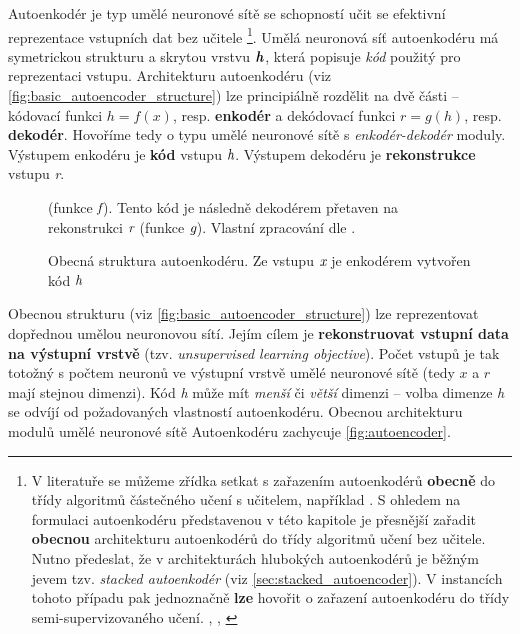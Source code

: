 Autoenkodér je typ umělé neuronové sítě se schopností učit se efektivní reprezentace vstupních dat bez učitele
\footnote{V literatuře se můžeme zřídka setkat s zařazením autoenkodérů \textbf{obecně} do třídy algoritmů částečného učení s učitelem, například \cite[str. 95]{Chollet2017}. S ohledem na formulaci autoenkodéru představenou v této kapitole je přesnější zařadit \textbf{obecnou} architekturu autoenkodérů do třídy algoritmů učení bez učitele. Nutno předeslat, že v architekturách hlubokých autoenkodérů je běžným jevem tzv. \emph{stacked autoenkodér} (viz \autoref{sec:stacked_autoencoder}). V instancích tohoto případu pak jednoznačně \textbf{lze} hovořit o zařazení autoenkodéru do třídy semi-supervizovaného učení. \cite{Bengio2006}, \cite{Ranzato2007}, \cite{Erhan2010}}.
Umělá neuronová síť autoenkodéru má symetrickou strukturu a skrytou vrstvu $\textbf{\emph{h}}$, která popisuje \emph{kód} použitý pro reprezentaci vstupu.
Architekturu autoenkodéru (viz \autoref{fig:basic_autoencoder_structure}) lze principiálně rozdělit na dvě části – kódovací funkci $h = f(x)$, resp. \textbf{enkodér}
a dekódovací funkci $r = g(h)$, resp. \textbf{dekodér}.
Hovoříme tedy o typu umělé neuronové sítě s \emph{enkodér-dekodér} moduly.
Výstupem enkodéru je \textbf{kód} vstupu $\emph{h}$. Výstupem dekodéru je \textbf{rekonstrukce} vstupu \emph{r}. \cite{Goodfellow2016}

\begin{figure}[h]
    \centering
    \caption{Obecná struktura autoenkodéru. Ze vstupu $\emph{x}$ je enkodérem vytvořen kód $\emph{h}$} (funkce $\emph{f}$). Tento kód je následně dekodérem přetaven na rekonstrukci $\emph{r}$ (funkce $\emph{g}$). Vlastní zpracování dle \textcite{Goodfellow2016}.
    \label{fig:basic_autoencoder_structure}
\end{figure}

Obecnou strukturu (viz \autoref{fig:basic_autoencoder_structure}) lze reprezentovat dopřednou umělou neuronovou sítí.
Jejím cílem je \textbf{rekonstruovat vstupní data na výstupní vrstvě} (tzv. \emph{unsupervised learning objective}). Počet vstupů je tak totožný s počtem neuronů ve výstupní vrstvě umělé neuronové sítě (tedy $x$ a $r$ mají stejnou dimenzi).
Kód \emph{h} může mít \emph{menší} či \emph{větší} dimenzi – volba dimenze \emph{h} se odvíjí od požadovaných vlastností autoenkodéru.
Obecnou architekturu modulů umělé neuronové sítě Autoenkodéru zachycuje \autoref{fig:autoencoder}. \cite{Charte2018}


